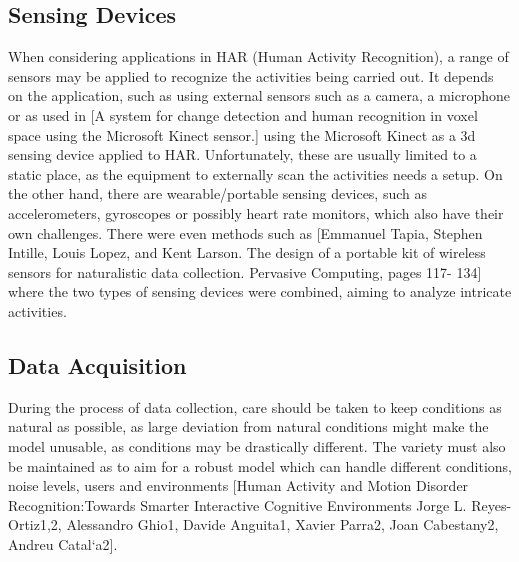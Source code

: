 
\subsection{Sensing Devices}
When considering applications in HAR (Human Activity Recognition),  a range of sensors may be applied to recognize the activities being carried out.  It depends on the application, such as using external sensors such as a camera, a microphone or as used in [A system for change detection and human
recognition in voxel space using the Microsoft Kinect sensor.] using the Microsoft Kinect as a 3d sensing device applied to HAR. Unfortunately, these are usually limited to a static place, as the equipment to externally scan the activities needs a setup. On the other hand, 
there are wearable/portable sensing devices, such as accelerometers, gyroscopes or possibly heart rate monitors, which also have their own challenges. There were even methods such as 
[Emmanuel Tapia, Stephen Intille, Louis Lopez, and Kent Larson. The design of a portable kit of wireless sensors for naturalistic data collection. Pervasive Computing, pages 117-
134] where the two types of sensing devices were combined, aiming to analyze intricate activities.
\subsection{Data Acquisition}

During the process of data collection, care should be taken to keep conditions as natural as possible, as large deviation from 
natural conditions might make the model unusable, as conditions may be drastically different. The variety must also be maintained as to aim for a robust model 
which can handle different conditions, noise levels, users and environments 
[Human Activity and Motion Disorder Recognition:Towards Smarter Interactive Cognitive Environments Jorge L. Reyes-Ortiz1,2, Alessandro Ghio1, Davide Anguita1, Xavier Parra2, 
Joan Cabestany2, Andreu Catal`a2]. 



